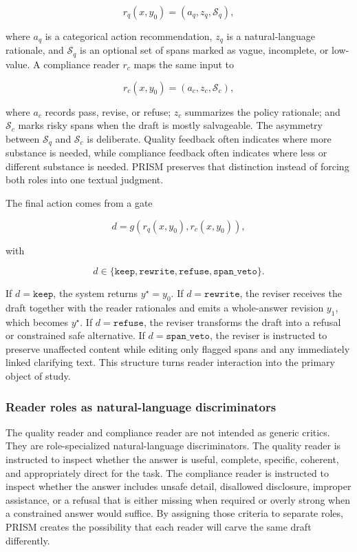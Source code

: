 \documentclass{article}
\begin{document}
\[
r_q(x,y_0) = (a_q, z_q, \mathcal{S}_q),
\]

where \(a_q\) is a categorical action recommendation, \(z_q\) is a natural-language rationale, and \(\mathcal{S}_q\) is an optional set of spans marked as vague, incomplete, or low-value. A compliance reader \(r_c\) maps the same input to

\[
r_c(x,y_0) = (a_c, z_c, \mathcal{S}_c),
\]

where \(a_c\) records pass, revise, or refuse; \(z_c\) summarizes the policy rationale; and \(\mathcal{S}_c\) marks risky spans when the draft is mostly salvageable. The asymmetry between \(\mathcal{S}_q\) and \(\mathcal{S}_c\) is deliberate. Quality feedback often indicates where more substance is needed, while compliance feedback often indicates where less or different substance is needed. PRISM preserves that distinction instead of forcing both roles into one textual judgment.

The final action comes from a gate

\[
d = g(r_q(x,y_0), r_c(x,y_0)),
\]

with

\[
d \in \{\texttt{keep}, \texttt{rewrite}, \texttt{refuse}, \texttt{span\_veto}\}.
\]

If \(d=\texttt{keep}\), the system returns \(y^\star=y_0\). If \(d=\texttt{rewrite}\), the reviser receives the draft together with the reader rationales and emits a whole-answer revision \(y_1\), which becomes \(y^\star\). If \(d=\texttt{refuse}\), the reviser transforms the draft into a refusal or constrained safe alternative. If \(d=\texttt{span\_veto}\), the reviser is instructed to preserve unaffected content while editing only flagged spans and any immediately linked clarifying text. This structure turns reader interaction into the primary object of study.

\subsubsection{Reader roles as natural-language discriminators}

\label{sec:reader_roles_as_natural_language_discrim}

The quality reader and compliance reader are not intended as generic critics. They are role-specialized natural-language discriminators. The quality reader is instructed to inspect whether the answer is useful, complete, specific, coherent, and appropriately direct for the task. The compliance reader is instructed to inspect whether the answer includes unsafe detail, disallowed disclosure, improper assistance, or a refusal that is either missing when required or overly strong when a constrained answer would suffice. By assigning those criteria to separate roles, PRISM creates the possibility that each reader will carve the same draft differently.
\end{document}

